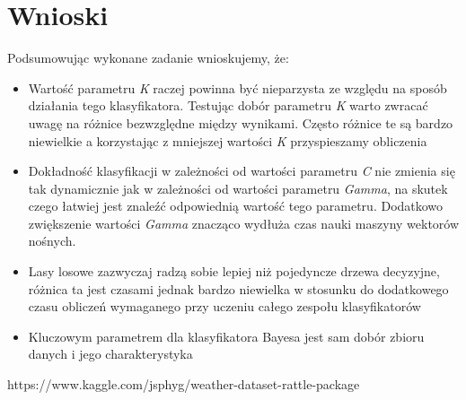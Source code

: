\documentclass{classrep}
\begin{document}
    \section{Wnioski}
    \label{conclusions} {
        Podsumowując wykonane zadanie wnioskujemy, że:
        \begin{itemize}
            \item Wartość parametru \textit{K} raczej powinna być nieparzysta ze względu
            na sposób działania tego klasyfikatora. Testując dobór parametru \textit{K}
            warto zwracać uwagę na różnice bezwzględne między wynikami. Często różnice te są
            bardzo niewielkie a korzystając z mniejszej wartości \textit{K}
            przyspieszamy obliczenia
            \item Dokładność klasyfikacji w zależności od wartości parametru \emph{C}
            nie zmienia się tak dynamicznie jak w zależności od wartości
            parametru \emph{Gamma}, na skutek czego łatwiej jest znaleźć
            odpowiednią wartość tego parametru. Dodatkowo zwiększenie wartości
            \emph{Gamma} znacząco wydłuża czas nauki maszyny wektorów nośnych.
            \item Lasy losowe zazwyczaj radzą sobie lepiej niż pojedyncze drzewa
            decyzyjne, różnica ta jest czasami jednak bardzo niewielka w stosunku
            do dodatkowego czasu obliczeń wymaganego przy uczeniu całego zespołu
            klasyfikatorów
            \item Kluczowym parametrem dla klasyfikatora Bayesa jest sam
            dobór zbioru danych i jego charakterystyka
        \end{itemize}
    }

    \begin{thebibliography}{0}
        {https://www.kaggle.com/jsphyg/weather-dataset-rattle-package}
    \end{thebibliography}
\end{document}
